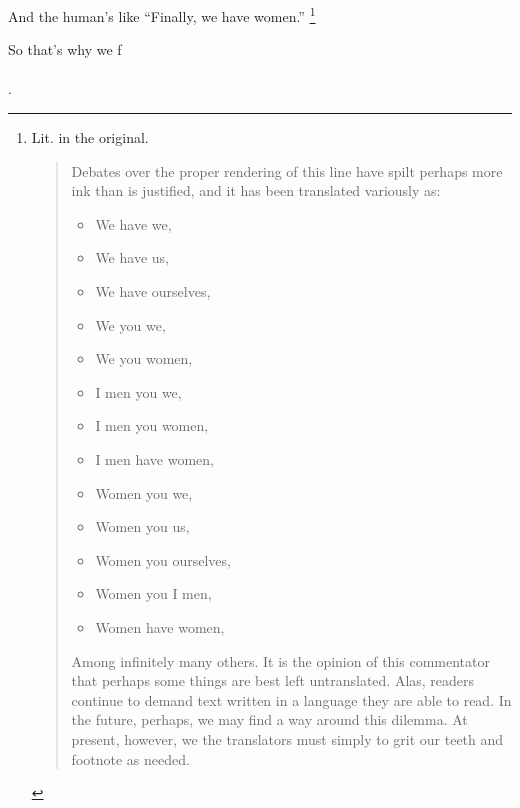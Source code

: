 {
}
{
}
{
	And the human's like ``Finally, we have women.''%
	\footnote{
		Lit.
		in the original.\\

	\begin{quote}
		\vspace{-1.8em}
		\hspace{-1.5em}
		Debates over the proper rendering of this line have spilt perhaps more ink than is justified,
		and it has been translated variously as:
		\begin{itemize}
		\item We have we,
		\item We have us,
		\item We have ourselves,
		\item We you we,
		\item We you women,
		\item I men you we,
		\item I men you women,
		\item I men have women,
		\item Women you we,
		\item Women you us,
		\item Women you ourselves,
		\item Women you I men,
		\item Women have women,
		\end{itemize}
		\noindent
		Among infinitely many others.
		It is the opinion of this commentator that perhaps some things are best left untranslated.
		Alas, readers continue to demand text written in a language they are able to read.
		In the future, perhaps, we may find a way around this dilemma.
		At present, however, we the translators must simply to grit our teeth and footnote as needed.
	\end{quote}
	}
}

{
}
{
}
{
	So that's why we f\\
	\\
	.
}
